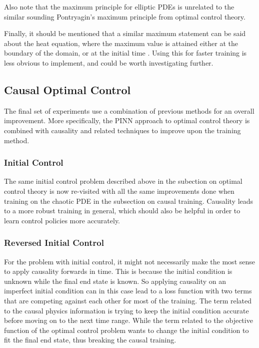 Also note that the maximum principle for elliptic PDEs is unrelated to the similar sounding Pontryagin's maximum principle \cite{pontryagin62} from optimal control theory.

Finally, it should be mentioned that a similar maximum statement can be said about the heat equation, where the maximum value is attained either at the boundary of the domain, or at the initial time \cite{pdebookcourse}. Using this for faster training is less obvious to implement, and could be worth investigating further.

\subsection{Causal Optimal Control}

The final set of experiments use a combination of previous methods for an overall improvement. More specifically, the PINN approach to optimal control theory is combined with causality and related techniques to improve upon the training method.

\subsubsection{Initial Control}

The same initial control problem described above in the subection on optimal control theory is now re-visited with all the same improvements done when training on the chaotic PDE in the subsection on causal training. Causality leads to a more robust training in general, which should also be helpful in order to learn control policies more accurately.

\subsubsection{Reversed Initial Control}

For the problem with initial control, it might not necessarily make the most sense to apply causality forwards in time. This is because the initial condition is unknown while the final end state is known. So applying causality on an imperfect initial condition can in this case lead to a loss function with two terms that are competing against each other for most of the training. The term related to the causal physics information is trying to keep the initial condition accurate before moving on to the next time range. While the term related to the objective function of the optimal control problem wants to change the initial condition to fit the final end state, thus breaking the causal training.

